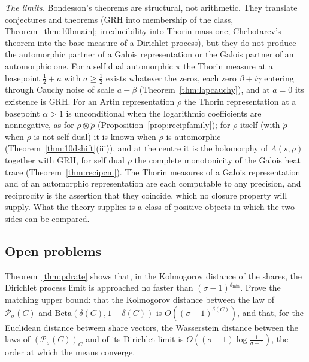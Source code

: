 \emph{The limits.} Bondesson's theorems are structural, not arithmetic. They translate conjectures and theorems (GRH into membership of the class, Theorem~\ref{thm:10bmain}; irreducibility into Thorin mass one; Chebotarev's theorem into the base measure of a Dirichlet process), but they do not produce the automorphic partner of a Galois representation or the Galois partner of an automorphic one. For a self dual automorphic $\pi$ the Thorin measure at a basepoint $\frac12+a$ with $a\ge\frac12$ exists whatever the zeros, each zero $\beta+i\gamma$ entering through Cauchy noise of scale $a-\beta$ (Theorem~\ref{thm:lapcauchy}), and at $a=0$ its existence is GRH. For an Artin representation $\rho$ the Thorin representation at a basepoint $\alpha>1$ is unconditional when the logarithmic coefficients are nonnegative, as for $\rho\otimes\check\rho$ (Proposition~\ref{prop:recipfamily}); for $\rho$ itself (with $\check\rho$ when $\rho$ is not self dual) it is known when $\rho$ is automorphic (Theorem~\ref{thm:10dshift}(iii)), and at the centre it is the holomorphy of $\Lambda(s,\rho)$ together with GRH, for self dual $\rho$ the complete monotonicity of the Galois heat trace (Theorem~\ref{thm:recipcm}). The Thorin measures of a Galois representation and of an automorphic representation are each computable to any precision, and reciprocity is the assertion that they coincide, which no closure property will supply. What the theory supplies is a class of positive objects in which the two sides can be compared.

\subsection{Open problems}

\begin{problem}\label{op:pdrate}
Theorem~\ref{thm:pdrate} shows that, in the Kolmogorov distance of the shares, the Dirichlet process limit is approached no faster than $(\sigma-1)^{\delta_{\min}}$. Prove the matching upper bound: that the Kolmogorov distance between the law of $\mathcal P_\sigma(C)$ and $\mathrm{Beta}(\delta(C),1-\delta(C))$ is $O((\sigma-1)^{\delta(C)})$, and that, for the Euclidean distance between share vectors, the Wasserstein distance between the laws of $(\mathcal P_\sigma(C))_C$ and of its Dirichlet limit is $O((\sigma-1)\log\frac1{\sigma-1})$, the order at which the means converge.
\end{problem}

